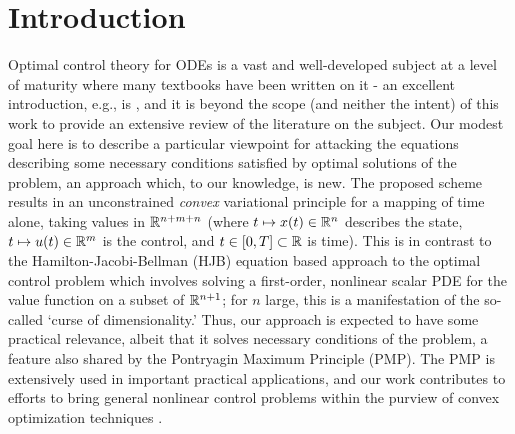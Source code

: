 \documentclass[11pt]{article}
\begin{document}
\section{Introduction}
Optimal control theory for ODEs is a vast and well-developed subject at a level of maturity where many textbooks have been written on it - an excellent introduction, e.g., is \cite{evans1983introduction}, and it is beyond the scope (and neither the intent) of this work to provide an extensive review of the literature on the subject. Our modest goal here is to describe a particular viewpoint for attacking the equations describing some necessary conditions satisfied by optimal solutions of the problem, an approach which, to our knowledge, is new. The proposed scheme results in an unconstrained \emph{convex} variational principle for a mapping of time alone, taking values in $\mathbb R^{n+m+n}$ (where $t \mapsto x(t) \in \mathbb R^n$ describes the state, $t \mapsto u(t) \in \mathbb R^m$ is the control, and $t \in [0,T] \subset \mathbb R$ is time). This is in contrast to the Hamilton-Jacobi-Bellman (HJB) equation based approach to the optimal control problem which involves solving a first-order, nonlinear scalar PDE for the value function on a subset of $\mathbb R^{n+1}$; for $n$ large, this is a manifestation of the so-called `curse of dimensionality.'  Thus, our approach is expected to have some practical relevance, albeit that it solves necessary conditions of the problem, a feature also shared by the Pontryagin Maximum Principle (PMP). The PMP is extensively used in important practical applications, and our work contributes to efforts to bring general nonlinear control problems within the purview of convex optimization techniques \cite{malyuta2022convex}.
\end{document}
